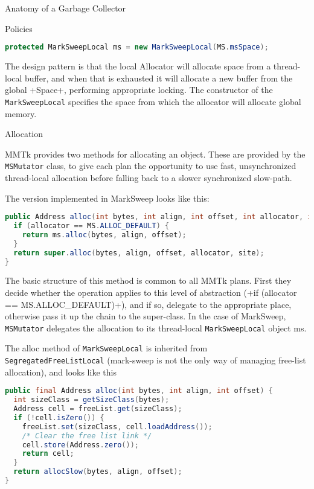 \begin{section}{Anatomy of a Garbage Collector}
\begin{subsection}{Policies}
\begin{lstlisting}[language=Java,title=MSMutator.java]
protected MarkSweepLocal ms = new MarkSweepLocal(MS.msSpace);
\end{lstlisting}

The design pattern is that the local Allocator will allocate space from a thread-local buffer, and when that is exhausted it will allocate a new buffer from the global \spverb+Space+, performing appropriate locking.  The constructor of the \texttt{MarkSweepLocal} specifies the space from which the allocator will allocate global memory.

\end{subsection}

\begin{subsection}{Allocation}

MMTk provides two methods for allocating an object.  These are provided by the \texttt{MS\-Mu\-ta\-tor} class, to give each plan the opportunity to use fast, unsynchronized thread-local allocation before falling back to a slower synchronized slow-path.

The version implemented in MarkSweep looks like this:

\begin{lstlisting}[language=java,title=MSMutator.java]
public Address alloc(int bytes, int align, int offset, int allocator, int site) {
  if (allocator == MS.ALLOC_DEFAULT) {
    return ms.alloc(bytes, align, offset);
  }
  return super.alloc(bytes, align, offset, allocator, site);
}
\end{lstlisting}

The basic structure of this method is common to all MMTk plans.  First they decide whether the operation applies to this level of abstraction (\spverb+if (allocator == MS.ALLOC_DEFAULT)+), and if so, delegate to the appropriate place, otherwise pass it up the chain to the super-class.  In the case of MarkSweep, \texttt{MS\-Mu\-ta\-tor} delegates the allocation to its thread-local \texttt{MarkSweepLocal} object ms.

The alloc method of \texttt{MarkSweepLocal} is inherited from \texttt{SegregatedFreeListLocal} (mark-sweep is not the only way of managing free-list allocation), and looks like this

\begin{lstlisting}[language=Java, title=SegregatedFreeListLocal.java (simplified)]
public final Address alloc(int bytes, int align, int offset) {
  int sizeClass = getSizeClass(bytes);
  Address cell = freeList.get(sizeClass);
  if (!cell.isZero()) {
    freeList.set(sizeClass, cell.loadAddress());
    /* Clear the free list link */
    cell.store(Address.zero());
    return cell;
  }
  return allocSlow(bytes, align, offset);
}
\end{lstlisting}


\end{subsection}
\end{section}
